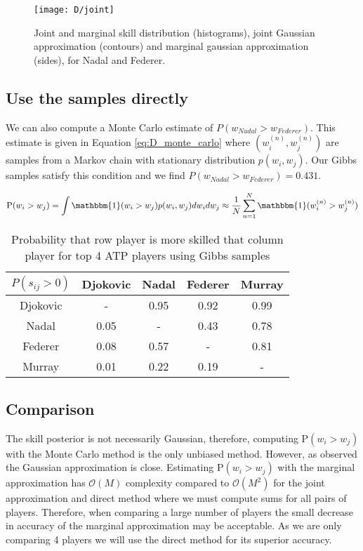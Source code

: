 \documentclass[11pt]{article}
\begin{document}
\begin{figure}
    \centering
    \texttt{[image: D/joint]}
    \caption{Joint and marginal skill distribution (histograms), joint Gaussian approximation (contours) and marginal gaussian approximation (sides), for Nadal and Federer.}
    \label{fig:D_joint}
\end{figure}

\subsection{Use the samples directly}
We can also compute a Monte Carlo estimate of $P(w_{Nadal} > w_{Federer})$. This estimate is given in Equation \ref{eq:D_monte_carlo} where $(w_{i}^{(n)}, w_{j}^{(n)})$ are samples from a Markov chain with stationary distribution $p(w_{i}, w_{j})$. Our Gibbs samples satisfy this condition and we find $P(w_{Nadal} > w_{Federer}) = 0.431$.

\begin{equation}
    \text{P}(w_{i} > w_{j}) = \int \mathbbm{1}(w_{i} > w_{j}) p(w_{i}, w_{j}) dw_{i} dw_{j} \approx \frac{1}{N} \sum_{n=1}^{N} \mathbbm{1}(w_{i}^{(n)} > w_{j}^{(n)})
    \label{eq:D_monte_carlo}
\end{equation}

\begin{table}
    \centering
    \small
    \setlength{\tabcolsep}{2pt}
    \begin{tabular}{|c|c c c c|}
        \hline
        $P(s_{ij}>0)$ & Djokovic & Nadal & Federer & Murray \\
        \hline
        Djokovic & -    & 0.95 & 0.92 & 0.99 \\
        Nadal    & 0.05 & -    & 0.43 & 0.78 \\
        Federer  & 0.08 & 0.57 & -    & 0.81 \\
        Murray   & 0.01 & 0.22 & 0.19 & -    \\
        \hline
    \end{tabular}
    \caption{Probability that row player is more skilled that column player for top 4 ATP players using Gibbs samples}
    \label{tbl:D_skill_difference}
\end{table}

\subsection{Comparison}
The skill posterior is not necessarily Gaussian, therefore, computing $\text{P}(w_{i} > w_{j})$ with the Monte Carlo method is the only unbiased method. However, as observed the Gaussian approximation is close. Estimating $\text{P}(w_{i} > w_{j})$ with the marginal approximation has $\mathcal{O}(M)$ complexity compared to $\mathcal{O}(M^2)$ for the joint approximation and direct method where we must compute sums for all pairs of players. Therefore, when comparing a large number of players the small decrease in accuracy of the marginal approximation may be acceptable. As we are only comparing 4 players we will use the direct method for its superior accuracy.
\end{document}
